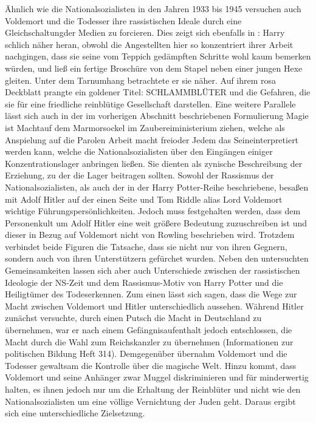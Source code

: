 Ähnlich wie die Nationalsozialisten in den Jahren 1933 bis 1945 versuchen auch Voldemort und die Todesser ihre rassistischen Ideale durch eine \glqq Gleichschaltung\grqq der Medien zu forcieren. Dies zeigt sich ebenfalls in \cite[S.256]{JKR10}: \glqq Harry schlich näher heran, obwohl die Angestellten hier so konzentriert ihrer Arbeit nachgingen, dass sie seine vom Teppich gedämpften Schritte wohl kaum bemerken würden, und ließ ein fertige Broschüre von dem Stapel neben einer jungen Hexe gleiten. Unter dem Tarnumhang betrachtete er sie näher. Auf ihrem rosa Deckblatt prangte ein goldener Titel: SCHLAMMBLÜTER und die Gefahren, die sie für eine friedliche reinblütige Gesellschaft darstellen\grqq. Eine weitere Parallele lässt sich auch in der im vorherigen Abschnitt beschriebenen Formulierung \glqq Magie ist Macht\grqq auf dem Marmorsockel im Zaubereiministerium ziehen, welche als Anspielung auf die Parolen  \glqq Arbeit macht frei\grqq oder \glqq Jedem das Seine\grqq interpretiert werden kann, welche die Nationalsozialisten über den Eingängen einiger Konzentrationslager anbringen ließen. Sie dienten als zynische Beschreibung der \glqq Erziehung\grqq, zu der die Lager beitragen sollten.
Sowohl der Rassismus der Nationalsozialisten, als auch der in der \glqq Harry Potter\grqq-Reihe beschriebene, besaßen mit Adolf Hitler auf der einen Seite und Tom Riddle alias Lord Voldemort wichtige Führungspersönlichkeiten. Jedoch muss festgehalten werden, dass dem Personenkult um Adolf Hitler eine weit größere Bedeutung zuzuschreiben ist und dieser in Bezug auf Voldemort nicht von Rowling beschrieben wird. Trotzdem verbindet beide Figuren die Tatsache, dass sie nicht nur von ihren Gegnern, sondern auch von ihren Unterstützern gefürchet wurden\cite [S.15]{JKR10}. 
Neben den untersuchten Gemeinsamkeiten lassen sich aber auch  Unterschiede zwischen der rassistischen Ideologie der NS-Zeit und dem Rassismus-Motiv von \glqq Harry Potter und die Heiligtümer des Todes\grqq erkennen. Zum einen lässt sich sagen, dass die Wege zur Macht zwischen Voldemort und Hitler unterschiedlich aussehen. Während Hitler zunächst versuchte, durch einen Putsch die Macht in Deutschland zu übernehmen, war er nach einem Gefängnisaufenthalt jedoch entschlossen, die Macht durch die Wahl zum Reichskanzler zu übernehmen (Informationen zur politischen Bildung Heft 314). Demgegenüber übernahm Voldemort und die Todesser gewaltsam die Kontrolle über die magische Welt\cite[S.13]{JKR10}. 
Hinzu kommt, dass Voldemort und seine Anhänger zwar Muggel diskriminieren und für minderwertig halten, es ihnen jedoch nur um die Erhaltung der Reinblüter und nicht wie den Nationalsozialisten um eine völlige Vernichtung der Juden geht\cite[S.43]{MW123}. Daraus ergibt sich eine unterschiedliche Zielsetzung.
